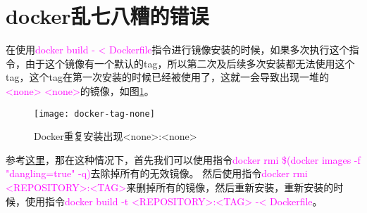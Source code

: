 \section{docker乱七八糟的错误}
在使用\textcolor{magenta}{docker build - < Dockerfile}指令进行镜像安装的时候，如果多次执行这个指令，由于这个镜像有一个默认的tag，所以第二次及后续多次安装都无法使用这个tag，这个tag在第一次安装的时候已经被使用了，这就一会导致出现一堆的\textcolor{magenta}{<none> <none>}的镜像，如图\ref{fig:docker-tag-none}。
\begin{figure}[htbp]
  \centering
  \texttt{[image: docker-tag-none]}
  \caption{Docker重复安装出现<none>:<none> \label{fig:docker-tag-none}}
\end{figure}

参考\href{https://stackoverflow.com/questions/30179716/what-are-none-repository-and-tags-why-do-they-appear-when-i-use-docker-build}{这里}，那在这种情况下，首先我们可以使用指令\textcolor{magenta}{docker rmi \$(docker images -f "dangling=true" -q)}去除掉所有的无效镜像。
然后使用指令\textcolor{magenta}{docker rmi <REPOSITORY>:<TAG>}来删掉所有的镜像，然后重新安装，重新安装的时候，使用指令\textcolor{magenta}{docker build -t <REPOSITORY>:<TAG> -< Dockerfile}。
